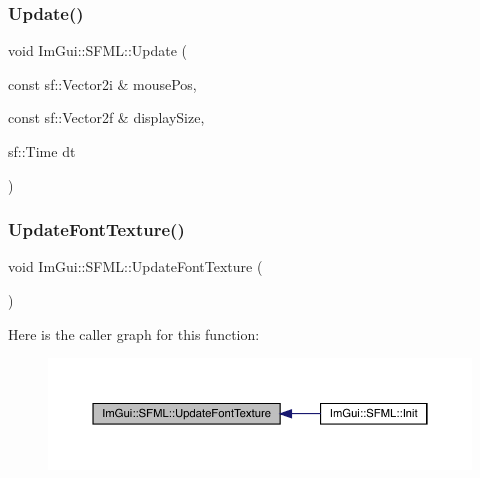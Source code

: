 \subsubsection{\texorpdfstring{Update()}{Update()}\hspace{0.1cm}{\footnotesize\ttfamily [3/3]}}
{\footnotesize\ttfamily void Im\+Gui\+::\+S\+F\+M\+L\+::\+Update (\begin{DoxyParamCaption}\item[{const sf\+::\+Vector2i \&}]{mouse\+Pos,  }\item[{const sf\+::\+Vector2f \&}]{display\+Size,  }\item[{sf\+::\+Time}]{dt }\end{DoxyParamCaption})}

\mbox{\label{namespace_im_gui_1_1_s_f_m_l_a1f969f6c562da1c000f4d5277a8ff075}} 
\subsubsection{\texorpdfstring{Update\+Font\+Texture()}{UpdateFontTexture()}}
{\footnotesize\ttfamily void Im\+Gui\+::\+S\+F\+M\+L\+::\+Update\+Font\+Texture (\begin{DoxyParamCaption}{ }\end{DoxyParamCaption})}

Here is the caller graph for this function\+:
\nopagebreak
\begin{figure}[H]
\begin{center}
\leavevmode
\includegraphics[width=350pt]{d1/d76/namespace_im_gui_1_1_s_f_m_l_a1f969f6c562da1c000f4d5277a8ff075_icgraph}
\end{center}
\end{figure}
